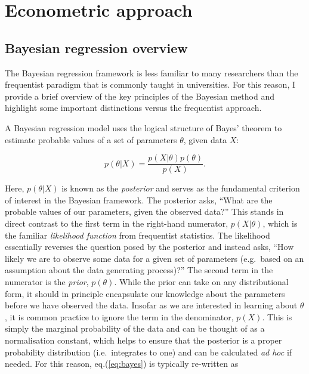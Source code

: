 \documentclass[smallextended]{svjour3}       %
\begin{document}
\hypertarget{sec:econometric}{%
\section{Econometric approach}\label{sec:econometric}}

\hypertarget{sec:bayesian}{%
\subsection{Bayesian regression overview}\label{sec:bayesian}}

The Bayesian regression framework is less familiar to many researchers
than the frequentist paradigm that is commonly taught in universities.
For this reason, I provide a brief overview of the key principles of the
Bayesian method and highlight some important distinctions versus the
frequentist approach.

A Bayesian regression model uses the logical structure of Bayes' theorem
to estimate probable values of a set of parameters \(\theta\), given
data \(X\):

\begin{equation}
    p(\theta|X) = \frac{p(X|\theta)p(\theta)}{p(X)}. \label{eq:bayes}
\end{equation}

Here, \(p(\theta|X)\) is known as the \textit{posterior} and serves as
the fundamental criterion of interest in the Bayesian framework. The
posterior asks, ``What are the probable values of our parameters, given
the observed data?'' This stands in direct contrast to the first term in
the right-hand numerator, \(p(X|\theta)\), which is the familiar
\textit{likelihood function} from frequentist statistics. The likelihood
essentially reverses the question posed by the posterior and instead
asks, ``How likely we are to observe some data for a given set of
parameters (e.g.~based on an assumption about the data generating
process)?'' The second term in the numerator is the \textit{prior},
\(p(\theta)\). While the prior can take on any distributional form, it
should in principle encapsulate our knowledge about the parameters
before we have observed the data. Insofar as we are interested in
learning about \(\theta\), it is common practice to ignore the term in
the denominator, \(p(X)\). This is simply the marginal probability of
the data and can be thought of as a normalisation constant, which helps
to ensure that the posterior is a proper probability distribution
(i.e.~integrates to one) and can be calculated \textit{ad hoc} if
needed. For this reason, eq.(\ref{eq:bayes}) is typically re-written as
\end{document}
